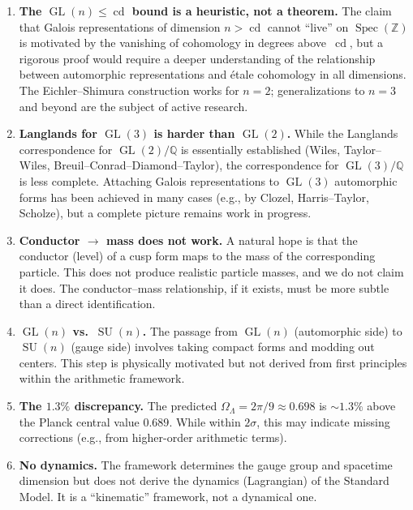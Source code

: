 \documentclass[12pt,a4paper]{article}
\theoremstyle{definition}
\newcommand{\Spec}{\operatorname{Spec}}
\newcommand{\GL}{\operatorname{GL}}
\newcommand{\SU}{\operatorname{SU}}
\newcommand{\cd}{\operatorname{cd}}
\newcommand{\Q}{\mathbb{Q}}
\newcommand{\Z}{\mathbb{Z}}
\newcommand{\OmL}{\Omega_\Lambda}
\begin{document}
\begin{enumerate}
  \item \textbf{The $\GL(n)\le\cd$ bound is a heuristic, not a theorem.}
    The claim that Galois representations of dimension $n > \cd$
    cannot ``live'' on $\Spec(\Z)$ is motivated by the vanishing
    of cohomology in degrees above~$\cd$, but a rigorous proof
    would require a deeper understanding of the relationship
    between automorphic representations and \'etale cohomology
    in all dimensions.
    The Eichler--Shimura construction works for $n=2$;
    generalizations to $n=3$ and beyond are the subject
    of active research.

  \item \textbf{Langlands for $\GL(3)$ is harder than $\GL(2)$.}
    While the Langlands correspondence for $\GL(2)/\Q$ is
    essentially established (Wiles, Taylor--Wiles, Breuil--Conrad--Diamond--Taylor),
    the correspondence for $\GL(3)/\Q$ is less complete.
    Attaching Galois representations to $\GL(3)$ automorphic forms
    has been achieved in many cases (e.g., by Clozel, Harris--Taylor,
    Scholze), but a complete picture remains work in progress.

  \item \textbf{Conductor $\to$ mass does not work.}
    A natural hope is that the conductor (level) of a cusp form
    maps to the mass of the corresponding particle.
    This does not produce realistic particle masses, and we
    do not claim it does.
    The conductor--mass relationship, if it exists, must be
    more subtle than a direct identification.

  \item \textbf{$\GL(n)$ vs.\ $\SU(n)$.}
    The passage from $\GL(n)$ (automorphic side) to $\SU(n)$
    (gauge side) involves taking compact forms and modding out
    centers.
    This step is physically motivated but not derived from
    first principles within the arithmetic framework.

  \item \textbf{The $1.3\%$ discrepancy.}
    The predicted $\OmL = 2\pi/9 \approx 0.698$ is $\sim 1.3\%$
    above the Planck central value $0.689$.
    While within $2\sigma$, this may indicate missing corrections
    (e.g., from higher-order arithmetic terms).

  \item \textbf{No dynamics.}
    The framework determines the gauge group and spacetime
    dimension but does not derive the dynamics (Lagrangian)
    of the Standard Model.
    It is a ``kinematic'' framework, not a dynamical one.
\end{enumerate}
\end{document}
